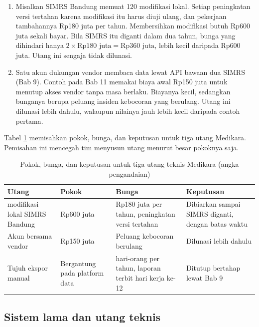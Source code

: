 \begin{enumerate}
  \item Misalkan SIMRS Bandung memuat 120 modifikasi lokal. Setiap peningkatan versi tertahan karena modifikasi itu harus diuji ulang,
        dan pekerjaan tambahannya Rp180 juta per tahun. Membersihkan modifikasi butuh Rp600 juta sekali bayar. Bila SIMRS itu diganti dalam dua
        tahun, bunga yang dihindari hanya $2 \times \text{Rp180 juta} = \text{Rp360 juta}$, lebih kecil daripada Rp600 juta. Utang ini sengaja
        tidak dilunasi.
  \item Satu akun dukungan vendor membaca data lewat API bawaan dua SIMRS (Bab 9). Contoh pada Bab 11 memakai biaya awal Rp150 juta untuk menutup akses
        vendor tanpa masa berlaku. Biayanya kecil, sedangkan bunganya berupa peluang insiden kebocoran yang berulang. Utang ini dilunasi lebih dahulu,
        walaupun nilainya jauh lebih kecil daripada contoh pertama.
\end{enumerate}

Tabel \ref{tab:ch07-utang} memisahkan pokok, bunga, dan keputusan untuk tiga utang Medikara. Pemisahan ini mencegah tim menyusun utang menurut
besar pokoknya saja.

\begin{table}[!htb]
  \centering
  \caption{Pokok, bunga, dan keputusan untuk tiga utang teknis Medikara (angka pengandaian)}
  \label{tab:ch07-utang}
  \small
  \begin{tabularx}{\textwidth}{>{\raggedright\arraybackslash}p{2.7cm}>{\raggedright\arraybackslash}p{2.0cm}>{\raggedright\arraybackslash}X>{\raggedright\arraybackslash}p{3.0cm}}
    \hline
    \textbf{Utang} & \textbf{Pokok} & \textbf{Bunga} & \textbf{Keputusan} \\
    \hline
    120 modifikasi lokal SIMRS Bandung & Rp600 juta & Rp180 juta per tahun, peningkatan versi tertahan & Dibiarkan sampai SIMRS diganti, dengan batas waktu \\
    \hline
    Akun bersama vendor & Rp150 juta & Peluang kebocoran berulang & Dilunasi lebih dahulu \\
    \hline
    Tujuh ekspor manual & Bergantung pada platform data & 144 hari-orang per tahun, laporan terbit hari kerja ke-12 & Ditutup bertahap lewat Bab 9 \\
    \hline
  \end{tabularx}
\end{table}

\subsection*{Sistem lama dan utang teknis}

